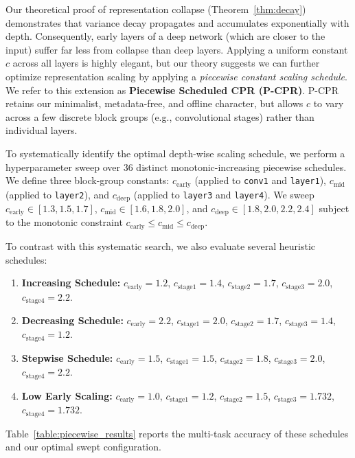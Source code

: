 \documentclass{article}
\theoremstyle{plain}
\theoremstyle{definition}
\theoremstyle{remark}
\begin{document}
Our theoretical proof of representation collapse (Theorem~\ref{thm:decay}) demonstrates that variance decay propagates and accumulates exponentially with depth. Consequently, early layers of a deep network (which are closer to the input) suffer far less from collapse than deep layers. Applying a uniform constant $c$ across all layers is highly elegant, but our theory suggests we can further optimize representation scaling by applying a \emph{piecewise constant scaling schedule}. We refer to this extension as \textbf{Piecewise Scheduled CPR (P-CPR)}. P-CPR retains our minimalist, metadata-free, and offline character, but allows $c$ to vary across a few discrete block groups (e.g., convolutional stages) rather than individual layers.

To systematically identify the optimal depth-wise scaling schedule, we perform a hyperparameter sweep over 36 distinct monotonic-increasing piecewise schedules. We define three block-group constants: $c_{\text{early}}$ (applied to \texttt{conv1} and \texttt{layer1}), $c_{\text{mid}}$ (applied to \texttt{layer2}), and $c_{\text{deep}}$ (applied to \texttt{layer3} and \texttt{layer4}). We sweep $c_{\text{early}} \in [1.3, 1.5, 1.7]$, $c_{\text{mid}} \in [1.6, 1.8, 2.0]$, and $c_{\text{deep}} \in [1.8, 2.0, 2.2, 2.4]$ subject to the monotonic constraint $c_{\text{early}} \le c_{\text{mid}} \le c_{\text{deep}}$.

To contrast with this systematic search, we also evaluate several heuristic schedules:
\begin{enumerate}
\item \textbf{Increasing Schedule:} $c_{\text{early}} = 1.2$, $c_{\text{stage1}} = 1.4$, $c_{\text{stage2}} = 1.7$, $c_{\text{stage3}} = 2.0$, $c_{\text{stage4}} = 2.2$.
\item \textbf{Decreasing Schedule:} $c_{\text{early}} = 2.2$, $c_{\text{stage1}} = 2.0$, $c_{\text{stage2}} = 1.7$, $c_{\text{stage3}} = 1.4$, $c_{\text{stage4}} = 1.2$.
\item \textbf{Stepwise Schedule:} $c_{\text{early}} = 1.5$, $c_{\text{stage1}} = 1.5$, $c_{\text{stage2}} = 1.8$, $c_{\text{stage3}} = 2.0$, $c_{\text{stage4}} = 2.2$.
\item \textbf{Low Early Scaling:} $c_{\text{early}} = 1.0$, $c_{\text{stage1}} = 1.2$, $c_{\text{stage2}} = 1.5$, $c_{\text{stage3}} = 1.732$, $c_{\text{stage4}} = 1.732$.
\end{enumerate}

Table~\ref{table:piecewise_results} reports the multi-task accuracy of these schedules and our optimal swept configuration.
\end{document}
